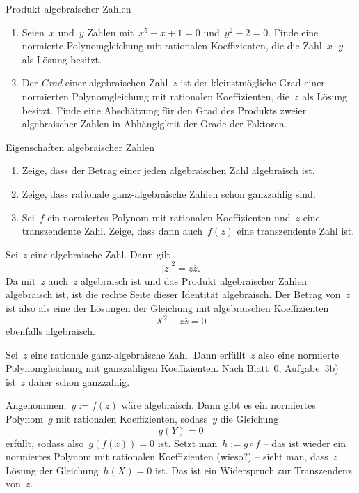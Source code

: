 \documentclass{algblatt}
\begin{document}
\begin{aufgabe}{Produkt algebraischer Zahlen}
\begin{enumerate}
\item Seien~$x$ und~$y$ Zahlen mit~$x^5-x+1=0$ und~$y^2-2=0$.
Finde eine normierte Polynomgleichung mit rationalen
Koeffizienten, die die Zahl~$x \cdot y$ als Lösung besitzt.
\item Der \emph{Grad} einer algebraischen Zahl~$z$ ist der kleinstmögliche Grad
einer normierten Polynomgleichung mit rationalen Koeffizienten, die~$z$ als Lösung
besitzt. Finde eine Abschätzung für den Grad des Produkts zweier algebraischer
Zahlen in Abhängigkeit der Grade der Faktoren.
\end{enumerate}
\end{aufgabe}

\begin{aufgabe}{Eigenschaften algebraischer Zahlen}
\begin{enumerate}
\item Zeige, dass der Betrag einer jeden algebraischen Zahl algebraisch ist.
\item Zeige, dass rationale ganz-algebraische Zahlen schon ganzzahlig sind.
\item Sei~$f$ ein normiertes Polynom mit rationalen Koeffizienten und~$z$ eine
transzendente Zahl. Zeige, dass dann auch~$f(z)$ eine transzendente Zahl ist.
\end{enumerate}
\begin{loesungE}
\item Sei~$z$ eine algebraische Zahl. Dann gilt
\[ |z|^2 = z \overline{z}. \]
Da mit~$z$ auch~$\overline{z}$ algebraisch ist und das Produkt algebraischer
Zahlen algebraisch ist, ist die rechte Seite dieser Identität algebraisch. Der
Betrag von~$z$ ist also als eine der Lösungen der Gleichung mit algebraischen
Koeffizienten
\[ X^2 - z \overline{z} = 0 \]
ebenfalls algebraisch.
\item Sei~$z$ eine rationale ganz-algebraische Zahl. Dann erfüllt~$z$ also eine
normierte Polynomgleichung mit ganzzahligen Koeffizienten. Nach Blatt~0,
Aufgabe~3b) ist~$z$ daher schon ganzzahlig.
\item Angenommen,~$y := f(z)$ wäre algebraisch. Dann gibt es ein normiertes
Polynom~$g$ mit rationalen Koeffizienten, sodass~$y$ die Gleichung
\[ g(Y) = 0 \]
erfüllt, sodass also~$g(f(z)) = 0$ ist. Setzt man~$h := g \circ f$ -- das ist
wieder ein normiertes Polynom mit rationalen Koeffizienten (wieso?) -- sieht
man, dass~$z$ Lösung der Gleichung~$h(X) = 0$ ist. Das ist ein Widerspruch zur
Transzendenz von~$z$.
\end{loesungE}
\end{aufgabe}
\end{document}
